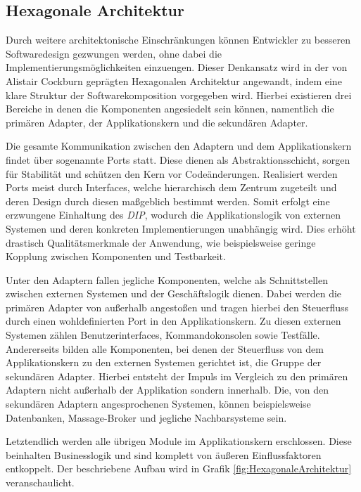 \subsection{Hexagonale Architektur}

Durch weitere architektonische Einschränkungen können Entwickler zu besseren Softwaredesign gezwungen werden, ohne dabei die Implementierungsmöglichkeiten einzuengen. Dieser Denkansatz wird in der von Alistair Cockburn geprägten Hexagonalen Architektur angewandt, indem eine klare Struktur der Softwarekomposition vorgegeben wird. Hierbei existieren drei Bereiche in denen die Komponenten angesiedelt sein können, namentlich die primären Adapter, der Applikationskern und die sekundären Adapter. 

Die gesamte Kommunikation zwischen den Adaptern und dem Applikationskern findet über sogenannte Ports statt. Diese dienen als Abstraktionsschicht, sorgen für Stabilität und schützen den Kern vor Codeänderungen. Realisiert werden Ports meist durch Interfaces, welche hierarchisch dem Zentrum zugeteilt und deren Design durch diesen maßgeblich bestimmt werden. Somit erfolgt eine erzwungene Einhaltung des \emph{\acrlong{DIP}}, wodurch die Applikationslogik von externen Systemen und deren konkreten Implementierungen unabhängig wird. Dies erhöht drastisch Qualitätsmerkmale der Anwendung, wie beispielsweise geringe Kopplung zwischen Komponenten und Testbarkeit.

Unter den Adaptern fallen jegliche Komponenten, welche als Schnittstellen zwischen externen Systemen und der Geschäftslogik dienen. Dabei werden die primären Adapter von außerhalb angestoßen und tragen hierbei den Steuerfluss durch einen wohldefinierten Port in den Applikationskern. Zu diesen externen Systemen zählen Benutzerinterfaces, Kommandokonsolen sowie Testfälle. Andererseits bilden alle Komponenten, bei denen der Steuerfluss von dem Applikationskern zu den externen Systemen gerichtet ist, die Gruppe der sekundären Adapter. Hierbei entsteht der Impuls im Vergleich zu den primären Adaptern nicht außerhalb der Applikation sondern innerhalb. Die, von den sekundären Adaptern angesprochenen Systemen, können beispielsweise Datenbanken, Massage-Broker und jegliche Nachbarsysteme sein. 

Letztendlich werden alle übrigen Module im Applikationskern erschlossen. Diese beinhalten Businesslogik und sind komplett von äußeren Einflussfaktoren entkoppelt. Der beschriebene Aufbau wird in Grafik \ref{fig:HexagonaleArchitektur} veranschaulicht.

